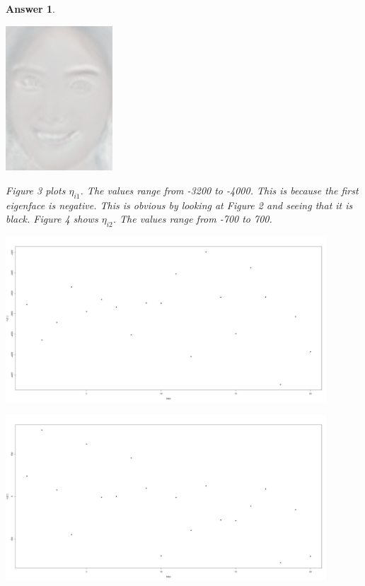 \documentclass[12pt]{article}
\theoremstyle{colon}
\newtheorem*{answer}{Answer}
\begin{document}
\begin{answer}
\begin{enumerate}[label=\arabic*)]
\begin{center}
        \includegraphics[width=0.3\textwidth]{eigenface6.png}
      \end{center}

      Figure 3 plots $\eta_{i1}$. The values range from -3200 to -4000. This is because the first eigenface is negative. This is obvious by looking at Figure 2 and seeing that it is black. Figure 4 shows $\eta_{i2}$. The values range from -700 to 700.
      \begin{center}
        \includegraphics[width=0.9\textwidth]{eta_1.jpg}
      \end{center}

      \begin{center}
        \includegraphics[width=0.9\textwidth]{eta_2.jpg}
      \end{center}


\end{enumerate}
\end{answer}
\end{document}
